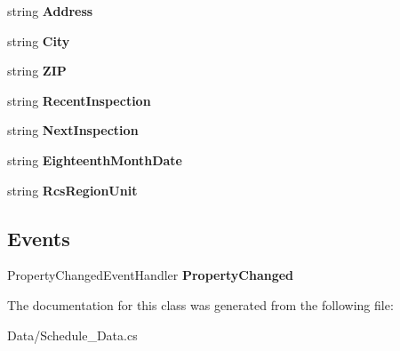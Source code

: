 \begin{DoxyCompactItemize}
\item 
\mbox{\label{class_a_f_h___scheduler_1_1_data_1_1_schedule_model_a29ea7b7814e03d4ba106d2f9bad91de2}} 
string {\bfseries Address}\hspace{0.3cm}{\ttfamily  [get, set]}
\item 
\mbox{\label{class_a_f_h___scheduler_1_1_data_1_1_schedule_model_a3e483d0ed0a9dd5ef6bd81fc5f30cbd0}} 
string {\bfseries City}\hspace{0.3cm}{\ttfamily  [get, set]}
\item 
\mbox{\label{class_a_f_h___scheduler_1_1_data_1_1_schedule_model_a3f2af7dd9e68634cf37f5ddf3546fe9d}} 
string {\bfseries Z\+IP}\hspace{0.3cm}{\ttfamily  [get, set]}
\item 
\mbox{\label{class_a_f_h___scheduler_1_1_data_1_1_schedule_model_a868655df065cde527295aeb486dac312}} 
string {\bfseries Recent\+Inspection}\hspace{0.3cm}{\ttfamily  [get, set]}
\item 
\mbox{\label{class_a_f_h___scheduler_1_1_data_1_1_schedule_model_a67d102ebdc67f61010488c5895c5257d}} 
string {\bfseries Next\+Inspection}\hspace{0.3cm}{\ttfamily  [get, set]}
\item 
\mbox{\label{class_a_f_h___scheduler_1_1_data_1_1_schedule_model_ad398d0c113fc4d2866b9add80953b9dd}} 
string {\bfseries Eighteenth\+Month\+Date}\hspace{0.3cm}{\ttfamily  [get, set]}
\item 
\mbox{\label{class_a_f_h___scheduler_1_1_data_1_1_schedule_model_af11a34d4e03f04fbf371a198b645770e}} 
string {\bfseries Rcs\+Region\+Unit}\hspace{0.3cm}{\ttfamily  [get, set]}
\end{DoxyCompactItemize}
\subsection*{Events}
\begin{DoxyCompactItemize}
\item 
\mbox{\label{class_a_f_h___scheduler_1_1_data_1_1_schedule_model_a951bacabdc3a2ba2eeefe156466829f6}} 
Property\+Changed\+Event\+Handler {\bfseries Property\+Changed}
\end{DoxyCompactItemize}


The documentation for this class was generated from the following file\+:\begin{DoxyCompactItemize}
\item 
Data/Schedule\+\_\+\+Data.\+cs\end{DoxyCompactItemize}
